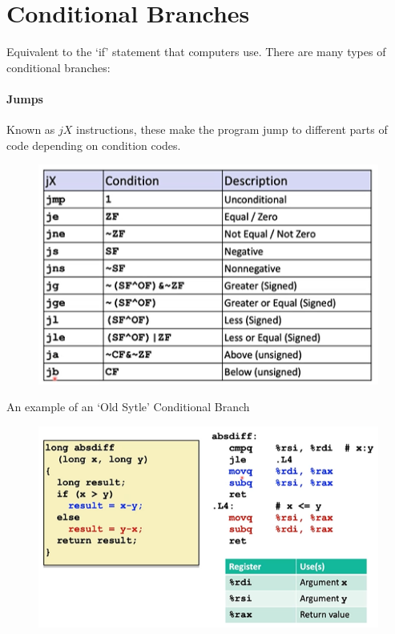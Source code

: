 \documentclass[12pt]{book}
\title{\coursetitle\linebreak\lecturename}
\author{\\Cain Susko\\ 
           \\ \\ \\
      Queen's University 
    \\School of Computing\\}
\begin{document}
\begin{titlepage}
        \maketitle
\end{titlepage}


\section*{Conditional Branches}
Equivalent to the `if' statement that computers use.
There are many types of conditional branches:

\paragraph{Jumps}
Known as $jX$ instructions, these make the program jump to different parts of code depending on condition codes.
 \begin{figure}[h]
        \centering
        \includegraphics{./figures/jx}
\end{figure}

An example of an `Old Sytle' Conditional Branch
\begin{figure}[h]
        \centering
        \includegraphics[scale = 0.7]{./figures/jxEx}
\end{figure}
\pagebreak
\end{document}

